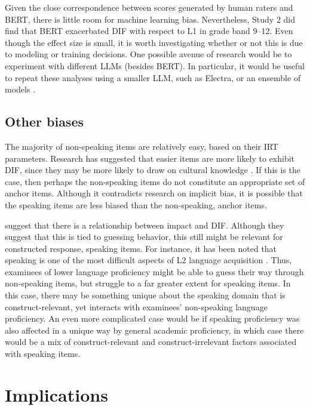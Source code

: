 \documentclass [PhD] {uclathes}
\begin{document}
Given the close correspondence between scores generated by human raters and BERT, there is little room for machine learning bias. Nevertheless, Study 2 did find that BERT exacerbated DIF with respect to L1 in grade band 9–12. Even though the effect size is small, it is worth investigating whether or not this is due to modeling or training decisions. One possible avenue of research would be to experiment with different LLMs (besides BERT). In particular, it would be useful to repeat these analyses using a smaller LLM, such as Electra, or an ensemble of models \citep{ormerod2022short}. 

\subsection{Other biases}

The majority of non-speaking items are relatively easy, based on their IRT parameters. Research has suggested that easier items are more likely to exhibit DIF, since they may be more likely to draw on cultural knowledge \citep{santelices2010unfair}. If this is the case, then perhaps the non-speaking items do not constitute an appropriate set of anchor items. Although it contradicts research on implicit bias, it is possible that the speaking items are less biased than the non-speaking, anchor items. 

\citet{dorans2004examining} suggest that there is a relationship between impact and DIF. Although they suggest that this is tied to guessing behavior, this still might be relevant for constructed response, speaking items. For instance, it has been noted that speaking is one of the most difficult aspects of L2 language acquisition \citep{brown2000principles}. Thus, examinees of lower language proficiency might be able to guess their way through non-speaking items, but struggle to a far greater extent for speaking items. In this case, there may be something unique about the speaking domain that is construct-relevant, yet interacts with examinees’ non-speaking language proficiency. An even more complicated case would be if speaking proficiency was also affected in a unique way by general academic proficiency, in which case there would be a mix of construct-relevant and construct-irrelevant factors associated with speaking items. 

\section{Implications}
\label{sec:implications}
\end{document}
